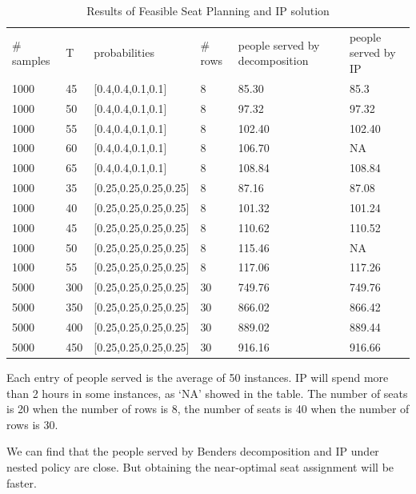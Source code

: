 \begin{table}[ht]
    \caption{Results of Feasible Seat Planning and IP solution}
    \begin{tabular}{|l|l|l|l|l|l|}
    \hline
    \# samples & T & probabilities & \# rows & people served by decomposition & people served by IP \\
    1000  & 45  & [0.4,0.4,0.1,0.1] & 8 & 85.30 & 85.3 \\
    1000  & 50  & [0.4,0.4,0.1,0.1] & 8 & 97.32 & 97.32 \\
    1000  & 55  & [0.4,0.4,0.1,0.1] & 8 & 102.40 & 102.40  \\ %
    1000  & 60  & [0.4,0.4,0.1,0.1] & 8 & 106.70 & NA  \\
    1000  & 65  & [0.4,0.4,0.1,0.1] & 8 & 108.84 & 108.84 \\
    \hline
    1000  & 35  & [0.25,0.25,0.25,0.25] & 8 & 87.16 & 87.08 \\
    1000  & 40  & [0.25,0.25,0.25,0.25] & 8 & 101.32 & 101.24 \\
    1000  & 45  & [0.25,0.25,0.25,0.25] & 8 & 110.62 & 110.52 \\
    1000  & 50  & [0.25,0.25,0.25,0.25] & 8 & 115.46 & NA \\
    1000  & 55  & [0.25,0.25,0.25,0.25] & 8 & 117.06 & 117.26 \\
    \hline
    5000  & 300  & [0.25,0.25,0.25,0.25] & 30 & 749.76 & 749.76 \\
    5000  & 350  & [0.25,0.25,0.25,0.25] & 30 & 866.02 & 866.42 \\
    5000  & 400  & [0.25,0.25,0.25,0.25] & 30 & 889.02 & 889.44 \\
    5000  & 450  & [0.25,0.25,0.25,0.25] & 30 & 916.16 & 916.66 \\
    \hline
    \end{tabular}
\end{table}

Each entry of people served is the average of 50 instances.
IP will spend more than 2 hours in some instances, as `NA' showed in the table.
The number of seats is 20 when the number of rows is 8, the number of seats is 40 when the number of rows is 30.

We can find that the people served by Benders decomposition and IP under nested policy are close. But obtaining the near-optimal seat assignment will be faster.


